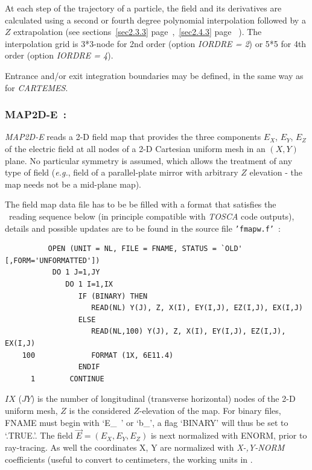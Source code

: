 {\medskip

\noindent At each step of the trajectory of a particle, the field and its 
derivatives are calculated using a second or fourth degree polynomial interpolation followed 
by a $ Z $ extrapolation (see sections~\ref{sec2.3.3} page~\pageref{sec2.3.3},~\ref{sec2.4.3} page ~\pageref{sec2.4.3}). 
The  interpolation grid is 3*3-node for 2nd order (option \textsl{IORDRE = 2}) or 5*5 
for 4th order (option \textsl{IORDRE = 4}). 

\medskip

\noindent Entrance and/or 
exit integration boundaries may be defined, in the same way as for \textsl{CARTEMES}.




\newpage

\subsubsection*{MAP2D-E~: \MAPTwoDETitl} \label{MAP2D-E} 
\medskip

\textsl{MAP2D-E} reads a 2-D field map that provides the three
components $ E_X$, $ E_Y $, $ E_Z $ of the electric field at all nodes of a 2-D Cartesian 
uniform mesh in an $(X,Y)$ plane. 
No particular symmetry is assumed, which allows the 
treatment of any type of field (\emph{e.g.},  field of a parallel-plate mirror with arbitrary $Z$ elevation 
- the map needs not be a mid-plane map). 

\medskip

\noindent The field map data file has to be be filled with a 
format that satisfies the  \FORTRAN\ reading sequence below (in principle compatible 
with \textsl{TOSCA} code outputs), details and possible updates are to be found in the source  
file \texttt{'fmapw.f'}~:  

{\footnotesize
\begin{verbatim}
	      OPEN (UNIT = NL, FILE = FNAME, STATUS = `OLD' [,FORM='UNFORMATTED'])
	       DO 1 J=1,JY 
	          DO 1 I=1,IX
	             IF (BINARY) THEN
	                READ(NL) Y(J), Z, X(I), EY(I,J), EZ(I,J), EX(I,J)
	             ELSE
	                READ(NL,100) Y(J), Z, X(I), EY(I,J), EZ(I,J), EX(I,J)
	100             FORMAT (1X, 6E11.4)
	             ENDIF
      1        CONTINUE
\end{verbatim}}
\medskip

\noindent $IX$ ($JY$) is the number of longitudinal (transverse horizontal) nodes of 
the 2-D uniform mesh, $Z$ is the considered $Z$-elevation of the map.   For 
binary files, FNAME must begin with \mbox{`E\_ '} or  \mbox{`b\_'}, a flag  `BINARY' will thus be 
set to `.TRUE.'. The field $ \vec  E=(E_X,E_Y,E_Z )$ is next normalized with 
ENORM, prior to ray-tracing.  As well the coordinates  X, Y are normalized with 
  \textsl{X-,Y-NORM} coefficients (useful to convert to centimeters, the working units in  \zgoubi. 


}
